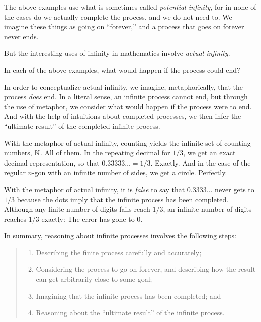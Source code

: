 The above examples use what is sometimes called \emph{potential infinity}, for in none of the cases do we actually complete the process, and we do not need to.  We imagine these things as going on ``forever,'' and a process that goes on forever never ends.  

But the interesting uses of infinity in mathematics involve \emph{actual infinity}.  
\begin{question}
In each of the above examples, what would happen if the process could end?
\end{question}
\QM

In order to conceptualize actual infinity, we imagine, metaphorically, that the process \emph{does} end.  In a literal sense, an infinite process cannot end, but through the use of metaphor, we consider what would happen if the process were to end.  And with the help of intuitions about completed processes, we then infer the ``ultimate result'' of the completed infinite process.    

With the metaphor of actual infinity, counting yields the infinite set of counting numbers, $\mathbb N$.  All of them.  In the repeating decimal for $1/3$, we get an exact decimal representation, so that $0.33333\ldots = 1/3$.  Exactly.  And in the case of the regular $n$-gon with an infinite number of sides, we get a circle.  Perfectly.  

\begin{warning}
With the metaphor of actual infinity, it is \emph{false} to say that $0.3333\ldots$ never gets to $1/3$ because the dots imply that the infinite process has been completed.  Although any finite number of digits fails reach $1/3$, an infinite number of digits reaches $1/3$ exactly:  The error has gone to 0.  
\end{warning}

In summary, reasoning about infinite processes involves the following steps:  
\begin{quote}
\begin{enumerate}
\item Describing the finite process carefully and accurately;
\item Considering the process to go on forever, and describing how the result can get arbitrarily close to some goal;
\item Imagining that the infinite process has been completed; and
\item Reasoning about the ``ultimate result'' of the infinite process.
\end{enumerate}
\end{quote}

